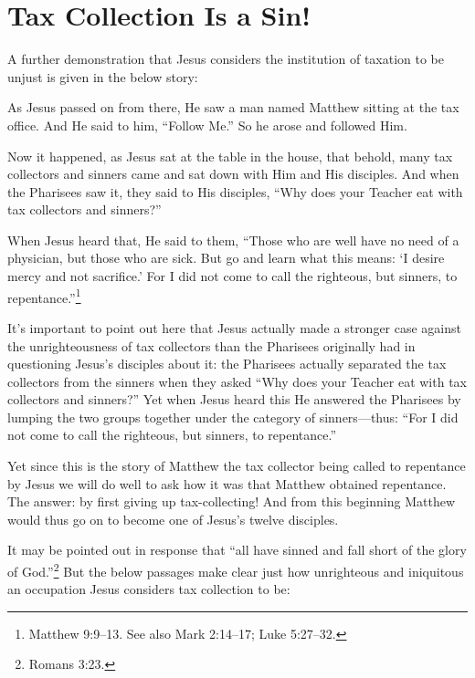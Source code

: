 \documentclass[letterpaper,12pt]{article}
\newenvironment{squotation}
  {\small\quotation}
  {\endquotation\normalsize}
\begin{document}
\section{Tax Collection Is a Sin!}
\label{sec:TaxCollectionIsASin}

A further demonstration that Jesus considers the institution of taxation to be unjust is given in the below story:

\begin{squotation}
As Jesus passed on from there, He saw a man named Matthew sitting at the tax office. And He said to him, ``Follow Me.'' So he arose and followed Him.

Now it happened, as Jesus sat at the table in the house, that behold, many tax collectors and sinners came and sat down with Him and His disciples. And when the Pharisees saw it, they said to His disciples, ``Why does your Teacher eat with tax collectors and sinners?''

When Jesus heard that, He said to them, ``Those who are well have no need of a physician, but those who are sick. But go and learn what this means: `I desire mercy and not sacrifice.' For I did not come to call the righteous, but sinners, to repentance.''\footnote{Matthew 9:9--13. See also Mark 2:14--17; Luke 5:27--32.}
\end{squotation}

It's important to point out here that Jesus actually made a stronger case against the unrighteousness of tax collectors than the Pharisees originally had in questioning Jesus's disciples about it: the Pharisees actually separated the tax collectors from the sinners when they asked ``Why does your Teacher eat with tax collectors and sinners?'' Yet when Jesus heard this He answered the Pharisees by lumping the two groups together under the category of sinners---thus: ``For I did not come to call the righteous, but sinners, to repentance.''

Yet since this is the story of Matthew the tax collector being called to repentance by Jesus we will do well to ask how it was that Matthew obtained repentance. The answer: by first giving up tax-collecting! And from this beginning Matthew would thus go on to become one of Jesus's twelve disciples.

It may be pointed out in response that ``all have sinned and fall short of the glory of God.''\footnote{Romans 3:23.} But the below passages make clear just how unrighteous and iniquitous an occupation Jesus considers tax collection to be:
\end{document}
